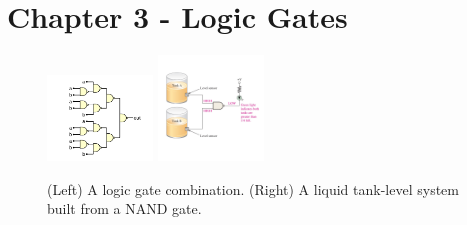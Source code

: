 \documentclass[10pt]{article}
\begin{document}
\section{Chapter 3 - Logic Gates}
\begin{figure}[ht]
\centering
\includegraphics[width=0.25\textwidth]{gateExample5.pdf}
\includegraphics[width=0.25\textwidth]{gateExample6.pdf}
\caption{\label{fig:gates1} (Left) A logic gate combination.  (Right) A liquid tank-level system built from a NAND gate.}
\end{figure}
\end{document}
